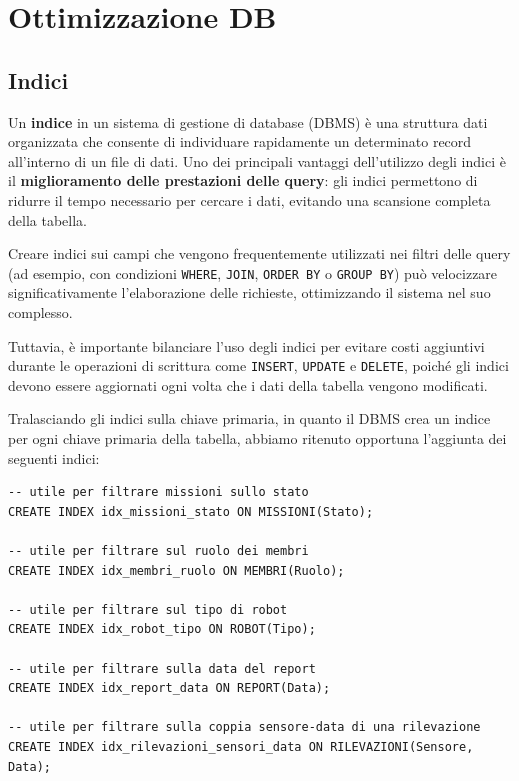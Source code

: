 \section{Ottimizzazione DB}

\subsection{Indici}

Un \textbf{indice} in un sistema di gestione di database (DBMS) è una struttura dati organizzata che consente di individuare rapidamente un determinato record all'interno di un file di dati. Uno dei principali vantaggi dell'utilizzo degli indici è il \textbf{miglioramento delle prestazioni delle query}: gli indici permettono di ridurre il tempo necessario per cercare i dati, evitando una scansione completa della tabella.

Creare indici sui campi che vengono frequentemente utilizzati nei filtri delle query (ad esempio, con condizioni \texttt{WHERE}, \texttt{JOIN}, \texttt{ORDER BY} o \texttt{GROUP BY}) può velocizzare significativamente l'elaborazione delle richieste, ottimizzando il sistema nel suo complesso.

Tuttavia, è importante bilanciare l'uso degli indici per evitare costi aggiuntivi durante le operazioni di scrittura come \texttt{INSERT}, \texttt{UPDATE} e \texttt{DELETE}, poiché gli indici devono essere aggiornati ogni volta che i dati della tabella vengono modificati.

Tralasciando gli indici sulla chiave primaria, in quanto il DBMS crea un indice per ogni chiave primaria della tabella, abbiamo ritenuto opportuna l'aggiunta dei seguenti indici: \\

\begin{lstlisting}
-- utile per filtrare missioni sullo stato
CREATE INDEX idx_missioni_stato ON MISSIONI(Stato); 

-- utile per filtrare sul ruolo dei membri
CREATE INDEX idx_membri_ruolo ON MEMBRI(Ruolo); 

-- utile per filtrare sul tipo di robot
CREATE INDEX idx_robot_tipo ON ROBOT(Tipo); 

-- utile per filtrare sulla data del report
CREATE INDEX idx_report_data ON REPORT(Data);

-- utile per filtrare sulla coppia sensore-data di una rilevazione
CREATE INDEX idx_rilevazioni_sensori_data ON RILEVAZIONI(Sensore, Data);
\end{lstlisting}

